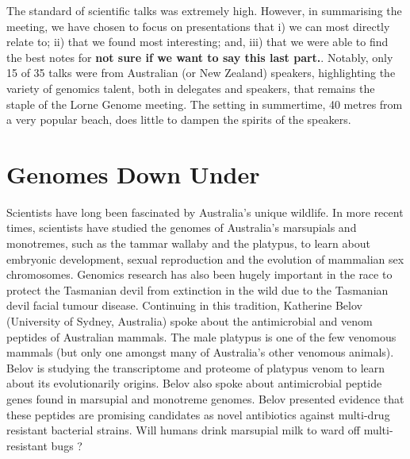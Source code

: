 \documentclass[twocolumn]{bmcart}%
\begin{document}
The standard of scientific talks was extremely high.  However, in summarising the meeting, we have chosen to focus on presentations that i) we can most directly relate to; ii) that we found most interesting; and, iii) that we were able to find the best notes for \textbf{not sure if we want to say this last part.}.  Notably, only 15 of 35 talks were from Australian (or New Zealand) speakers, highlighting the variety of genomics talent, both in delegates and speakers, that remains the staple of the Lorne Genome meeting.  The setting in summertime, 40 metres from a very popular beach, does little to dampen the spirits of the speakers.


%

\section*{Genomes Down Under}
Scientists have long been fascinated by Australia's unique wildlife. In more recent times, scientists have studied the genomes of Australia's marsupials and monotremes, such as the tammar wallaby and the platypus, to learn about embryonic development, sexual reproduction and the evolution of mammalian sex chromosomes. Genomics research has also been hugely important in the race to protect the Tasmanian devil from extinction in the wild due to the Tasmanian devil facial tumour disease. Continuing in this tradition, Katherine Belov (University of Sydney, Australia) spoke about the antimicrobial and venom peptides of Australian mammals. The male platypus is one of the few venomous mammals (but only one amongst many of Australia's other venomous animals). Belov is studying the transcriptome and proteome of platypus venom to learn about its evolutionarily origins. Belov also spoke about antimicrobial peptide genes found in marsupial and monotreme genomes. Belov presented evidence that these peptides are promising candidates as novel antibiotics against multi-drug resistant bacterial strains.  Will humans drink marsupial milk to ward off multi-resistant bugs ?
\end{document}
